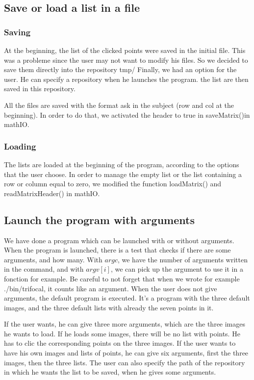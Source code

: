 \documentclass{report}
\begin{document}
\subsection{Save or load a list in a file}
\subsubsection{Saving}
At the beginning, the list of the clicked points were saved in the initial file. This was a probleme since the user may not want to modify his files. 
So we decided to save them directly into the repository tmp/ 
Finally, we had an option for the user. He can specify a repository when he launches the program. the list are then saved in this repository. 

All the files are saved with the format ask in the subject (row and col at the beginning). In order to do that, we activated the header to true in saveMatrix()in mathIO. 

\subsubsection{Loading}
The lists are loaded at the beginning of the program, according to the options that the user choose. In order to manage the empty list or the list containing a row or column equal to zero, we modified the function loadMatrix() and readMatrixHeader() in mathIO. 

\subsection{Launch the program with arguments}
We have done a program which can be launched with or without arguments. When the program is launched, there is a test that checks if there are some arguments, and how many. With $argc$, we have the number of arguments written in the command, and with $argv[i]$, we can pick up the argument to use it in a fonction for example.
Be careful to not forget that when we wrote for example ./bin/trifocal, it counts like an argument.
When the user does not give arguments, the default program is executed. It's a program with the three default images, and the three default lists with already the seven points in it.


If the user wants, he can give three more arguments, which are the three images he wants to load. If he loads some images, there will be no list with points. He has to clic the corresponding points on the three images. 
If the user wants to have his own images and lists of points, he can give six arguments, first the three images, then the three lists. 
The user can also specify the path of the repository in which he wants the list to be saved, when he gives some arguments. 
\end{document}
